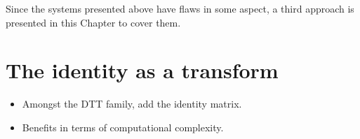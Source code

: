 \documentclass[11pt,a4paper,openright,twoside]{book}
\numberwithin{equation}{section} %
\numberwithin{figure}{section} %
\numberwithin{table}{section} %
\begin{document}
Since the systems presented above have flaws in some aspect, a third approach
is presented in this Chapter to cover them.

\section{The identity as a transform}
\label{sec:the_identity_as_a_transform}

\begin{itemize}
	\item Amongst the \ac{DTT} family, add the identity matrix.
	\item Benefits in terms of computational complexity.
\end{itemize}

\backmatter



\label{cha:index}
\printindex
{}
\thispagestyle{empty}
\end{document}
